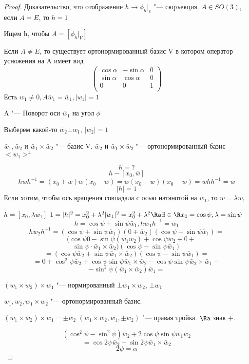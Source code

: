 \begin{proof}
Доказательство, что отображение $h \to \phi_h|_v$  "--- сюръекция.
$A \in SO(3)$, если $A = E$, то $h = 1$

Ищем h, чтобы $A = [\phi_h|_V]$

Если $A \ne E$, то существует ортонормированный базис V в котором оператор усножения на A имеет вид
$$
\begin{pmatrix}
\cos \alpha & - \sin \alpha & 0\\
\sin \alpha & \cos\alpha & 0\\
0 & 0 & 1\\
\end{pmatrix}
$$
Есть $w_1 \ne 0, A\bar w_1 = \bar w_1, |w_1| = 1$

A "--- Поворот оси $\bar w_1$  на угол $\phi$

Выберем какой-то $\bar w_2 \bot w_1$, $|w_2| = 1$

$\bar w_1, \bar w_2$ и $\bar w_1 \times \bar w_2$ "--- базис V.
$\bar w_2$ и $\bar w_1 \times \bar w_2$ "--- ортонормированный базис $<w_1>^\bot$

$$h = ?$$
$$h - [x_0, \bar w]$$
$$h \bar w h^{-1} = (x_0 + \bar w)\bar w(x_0 - \bar w) = \bar w(x_0 + \bar w)(x_0 - \bar w) = \bar w h h^{-1} = \bar w$$
$$|h| = 1$$
Если хотим, чтобы ось вращения совпадала с осью натянотой на $w_1$, то $w = \lambda w_1$

$h = [x_0, \lambda w_1]$
$1 = |h|^2 = x_0^2 + \lambda^2|w_1|^2 = x_0^2 + \lambda^2  \Ra \exists \in \R x_0 = \cos \psi, \lambda = \sin \psi$
$$h = \cos \psi + \sin \psi \bar w_1, hw_1h^{-1} = w_1$$
$$hw_2h^{-1} = (\cos \psi  + \sin \psi \bar w_1 )(0 + \bar w_2)(\cos \psi - \sin \psi \bar w_1) = $$
$$= (\cos \psi 0 - \sin \psi (\bar w_1 \bar w_2) + \cos \psi \bar w_2 + 0 + $$
$$\sin \psi \cdot \bar w_1 \times \bar w_2)(\cos \psi - \sin \psi \bar w_1)$$
$$= (\cos \psi \bar w_2 + \sin \psi \bar w_1 \times \bar w_2)(\cos \psi - \sin \psi \bar w_1) = $$
$$= 0 + \cos^2 \psi \bar w_2 + \cos \psi \sin \psi \bar w_1 \times \bar w_2 - \cos \psi \sin \psi \bar w_2 \times \bar w_1 - $$
$$- \sin^2 \psi(\bar w_1 \times \bar w_2) \bar w_1 = $$

$(w_1 \times w_2) \times w_1$ "--- нормированный $\bot w_1 \times w_2$, $\bot w_1$

$w_1, w_2, w_1 \times w_2$ "--- ортонормированный базис.

$(w_1 \times w_2) \times w_1 = \pm w_2$
$(w_1 \times w_2, w_1, \pm w_2)$ "--- правая тройка. $\Ra$ знак +.

$$= (\cos^2 \psi - \sin^2 \psi)\bar w_2 + 2 \cos \psi \sin \psi \bar w_1 \bar w_2 =  $$
$$= \cos 2 \psi \bar w_2 + \sin 2 \psi \bar w_1 \times \bar w_2$$
$$2 \psi = \alpha$$

\end{proof}

